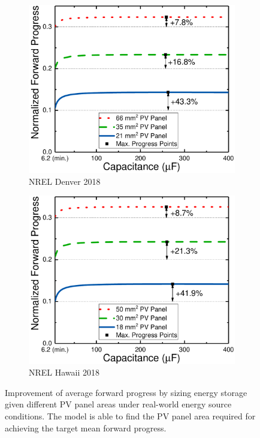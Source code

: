 \begin{figure}
\begin{subfigure}{0.49\columnwidth}
        \label{fig:harvstor2}
    \end{subfigure}
    \hfil
    \begin{subfigure}{0.49\columnwidth}
        \centering
        \includegraphics[width=\columnwidth]{ch4_sizingapproach/figures/HarvStorTgFig3}
        \caption{NREL Denver 2018}
        \label{fig:harvstor3}
    \end{subfigure}
    \begin{subfigure}{0.49\columnwidth}
        \centering
        \includegraphics[width=\columnwidth]{ch4_sizingapproach/figures/HarvStorTgFig4}
        \caption{NREL Hawaii 2018}
        \label{fig:harvstor4}
    \end{subfigure}
    \caption{Improvement of average forward progress by sizing energy storage given different PV panel areas under real-world energy source conditions. The model is able to find the PV panel area required for achieving the target mean forward progress. } 
    \label{fig:harvstor}
\end{figure}

